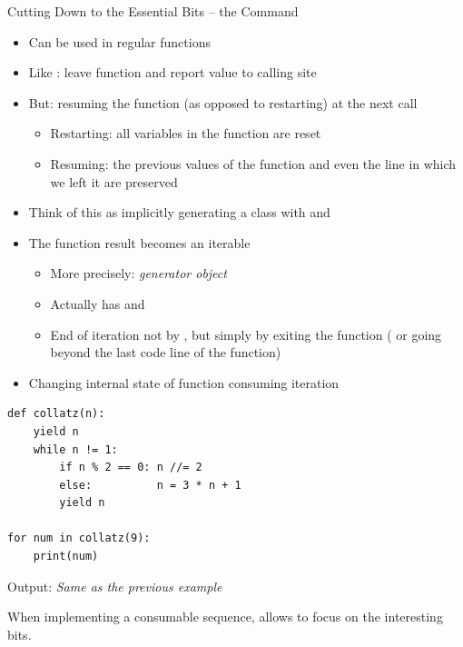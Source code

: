 
\begin{frame}[fragile]{Cutting Down to the Essential Bits -- the Command }
%
\begin{itemize}
\item Can be used in regular functions
\item Like : leave function and report value to calling site
\item But: resuming the function (as opposed to restarting) at the next call
	\begin{itemize}
	\item Restarting: all variables in the function are reset
	\item Resuming: the previous values of the function and even the line in which we left it are preserved
	\end{itemize}
\item Think of this as implicitly generating a class with  and 
\item The function result becomes an iterable
	\begin{itemize}
	\item More precisely: \emph{generator object}
	\item Actually has  and 
	\item End of iteration not by , but simply by exiting the function ( or going beyond the last code line of the function)
	\end{itemize}
\item Changing internal state of function \Thus consuming iteration
\end{itemize}
%
\end{frame}


\begin{frame}[fragile]
%
\begin{codebox}
\begin{verbatim}
def collatz(n):
    yield n
    while n != 1:
        if n % 2 == 0: n //= 2
        else:          n = 3 * n + 1
        yield n

for num in collatz(9):
    print(num)
\end{verbatim}
\end{codebox}
%
Output: \emph{Same as the previous example}
%
\begin{hintbox}
When implementing a consumable sequence,  allows to focus on the interesting bits.
\end{hintbox}
%
\end{frame}

